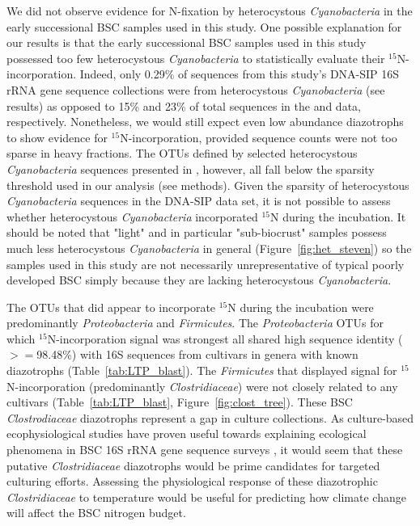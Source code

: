 We did not observe evidence for N-fixation by heterocystous
\textit{Cyanobacteria} in the early successional BSC samples used in this
study. One possible explanation for our results is that the early successional
BSC samples used in this study possessed too few heterocystous
\textit{Cyanobacteria} to statistically evaluate their $^{15}$N-incorporation.
Indeed, only 0.29\% of sequences from this study's DNA-SIP 16S rRNA gene
sequence collections were from heterocystous \textit{Cyanobacteria} (see results)
as opposed to 15\% and 23\% of total sequences in the \citet{Steven_2013} and
\citet{Garcia_Pichel_2013} data, respectively.  Nonetheless, we would still
expect even low abundance diazotrophs to show evidence for
$^{15}$N-incorporation, provided sequence counts were not too sparse in heavy
fractions. The OTUs defined by selected heterocystous \textit{Cyanobacteria}
sequences presented in \citet{Yeager}, however, all fall below the sparsity
threshold used in our analysis (see methods). Given the sparsity of
heterocystous \textit{Cyanobacteria} sequences in the DNA-SIP data set, it is
not possible to assess whether heterocystous \textit{Cyanobacteria}
incorporated $^{15}$N during the incubation. It should be noted that "light"
and in particular "sub-biocrust" samples possess much less heterocystous
\textit{Cyanobacteria} in general (Figure~\ref{fig:het_steven}) so the samples
used in this study are not necessarily unrepresentative of typical poorly
developed BSC simply because they are lacking heterocystous
\textit{Cyanobacteria}. 

The OTUs that did appear to incorporate $^{15}$N during the incubation were
predominantly \textit{Proteobacteria} and \textit{Firmicutes}. The
\textit{Proteobacteria} OTUs for which $^{15}$N-incorporation signal was
strongest all shared high sequence identity ($>=$98.48\%) with 16S sequences
from cultivars in genera with known diazotrophs (Table~\ref{tab:LTP_blast}).
The \textit{Firmicutes} that displayed signal for $^{15}$N-incorporation
(predominantly \textit{Clostridiaceae}) were not closely related to any
cultivars (Table~\ref{tab:LTP_blast}, Figure~\ref{fig:clost_tree}). These BSC
\textit{Clostrodiaceae} diazotrophs represent a gap in culture collections. As
culture-based ecophysiological studies have proven useful towards explaining
ecological phenomena in BSC 16S rRNA gene sequence surveys
\citep{Garcia_Pichel_2013}, it would seem that these putative
\textit{Clostridiaceae} diazotrophs would be prime candidates for targeted
culturing efforts. Assessing the physiological response of these diazotrophic
\textit{Clostridiaceae} to temperature would be useful for predicting how
climate change will affect the BSC nitrogen budget.

